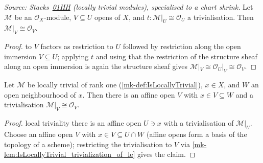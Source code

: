 \begin{lemma}\label{mk-lem:IsLocallyTrivial_trivialization_of_le}
  \leanok

  \textit{Source: Stacks~\href{https://stacks.math.columbia.edu/tag/01HH}{01HH}
  (locally trivial modules), specialised to a chart shrink.}
  Let \(\mathcal M\) be an \(\mathcal O_X\)-module, \(V \subseteq U\) opens of
  \(X\), and \(t : \mathcal M|_U \cong \mathcal O_U\) a trivialisation. Then
  \(\mathcal M|_V \cong \mathcal O_V\).
\end{lemma}
\begin{proof}
  \leanokRestriction to \(V\) factors as restriction to \(U\) followed by
  restriction along the open immersion \(V \subseteq U\); applying \(t\) and
  using that the restriction of the structure sheaf along an open immersion
  is again the structure sheaf gives \(\mathcal M|_V \cong \mathcal O_U|_V
  \cong \mathcal O_V\).
\end{proof}

\begin{lemma}\label{mk-cor:IsLocallyTrivial_exists_affine_trivializing_le}
  \leanok

  Let \(\mathcal M\) be locally trivial of rank one
  (\ref{mk-def:IsLocallyTrivial}), \(x \in X\), and \(W\) an open neighbourhood
  of \(x\). Then there is an affine open \(V\) with \(x \in V \subseteq W\)
  and a trivialisation \(\mathcal M|_V \cong \mathcal O_V\).
\end{lemma}
\begin{proof}
  \leanokBy local triviality there is an affine open \(U \ni x\) with a
  trivialisation of \(\mathcal M|_U\). Choose an affine open \(V\) with
  \(x \in V \subseteq U \cap W\) (affine opens form a basis of the topology
  of a scheme); restricting the trivialisation to \(V\) via
  \ref{mk-lem:IsLocallyTrivial_trivialization_of_le} gives the claim.
\end{proof}


